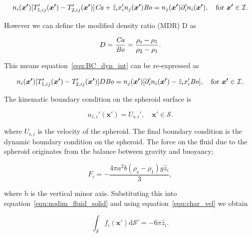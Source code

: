 \documentclass[12pt]{article}
\newcommand\Bo{\mbox{\textit{Bo}}}  %
\newcommand\Ca{\mbox{\textit{Ca}}} %
\begin{document}
\begin{equation}
\label{equ:BC_dyn_int}
n_{i}(\boldsymbol{x'}) [T_{1, ij}'(\boldsymbol{x'}) - T_{2,ij}'(\boldsymbol{x'})] \Ca + \hat{z}_{i} x_{i}' n_{j}(\boldsymbol{x'}) \Bo = n_{j}(\boldsymbol{x'}) \partial_{i}' n_{i}(\boldsymbol{x'}), \quad \text{for } \boldsymbol{x'} \in \mathcal{I}.
\end{equation}

However we can define the modified density ratio (MDR) D as

\begin{equation}
\label{equ:dim_dens_rat}
D = \frac{\Ca}{\Bo} = \frac{\rho_{\text{s}} - \rho_{1}}{\rho_{2} - \rho_{1}}.
\end{equation}

This means equation~\ref{equ:BC_dyn_int} can be re-expressed as

\begin{equation}
\label{equ:d_int}
n_{i}(\boldsymbol{x'}) [T_{1, ij}'(\boldsymbol{x'}) - T_{2, ij}'(\boldsymbol{x'})] D \Bo = n_{j}(\boldsymbol{x'})[\partial_{i}' n_{i}(\boldsymbol{x'}) - \hat{z}_{i} x_{i}' \Bo] , \quad \text{for } \boldsymbol{x'} \in \mathcal{I}.
\end{equation}

The kinematic boundary condition on the spheroid surface is 

\begin{equation}
\label{equ:BC_kin_spere}
u_{1,i}'(\boldsymbol{x'}) = U_{\text{s},i}', \quad \boldsymbol{x'} \in \mathcal{S}.
\end{equation}

where $U_{\text{s},i}$ is the velocity of the spheroid. The final boundary condition is the dynamic boundary condition on the spheroid. The force on the fluid due to the spheroid originates from the balance between gravity and buoyancy;

\begin{equation}
\label{equ:sphere_force}
F_{i} = -\frac{4 \pi a^{2} b (\rho_{\text{s}} - \rho_{1}) g \hat{z}_{i}}{3},
\end{equation}

where b is the vertical minor axis. Substituting this into equation~\ref{equ:nodim_fluid_solid} and using equation~\ref{equ:char_vel} we obtain

\begin{equation}
\label{equ:BC_dyn_sphere}
\int_{\mathcal{S}} f_{i}(\boldsymbol{x'}) \mathrm{d} \mathcal{S}' = -6 \pi \hat{z}_{i}.
\end{equation}
\end{document}
